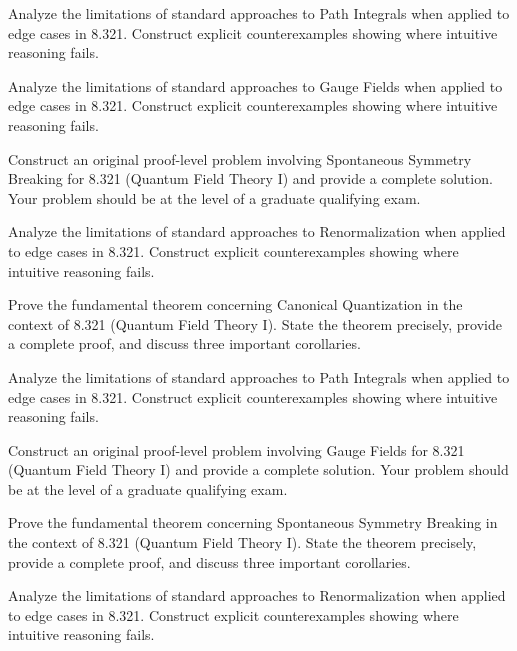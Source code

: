 \documentclass[12pt,a4paper]{exam}
\begin{document}
\begin{questions}
\vspace{0.3cm}

\question[4]
Analyze the limitations of standard approaches to Path Integrals when applied to edge cases in 8.321. Construct explicit counterexamples showing where intuitive reasoning fails.

\vspace{0.3cm}

\question[5]
Analyze the limitations of standard approaches to Gauge Fields when applied to edge cases in 8.321. Construct explicit counterexamples showing where intuitive reasoning fails.

\vspace{0.3cm}

\question[3]
Construct an original proof-level problem involving Spontaneous Symmetry Breaking for 8.321 (Quantum Field Theory I) and provide a complete solution. Your problem should be at the level of a graduate qualifying exam.

\vspace{0.3cm}

\question[6]
Analyze the limitations of standard approaches to Renormalization when applied to edge cases in 8.321. Construct explicit counterexamples showing where intuitive reasoning fails.

\vspace{0.3cm}

\question[4]
Prove the fundamental theorem concerning Canonical Quantization in the context of 8.321 (Quantum Field Theory I). State the theorem precisely, provide a complete proof, and discuss three important corollaries.

\vspace{0.3cm}

\question[3]
Analyze the limitations of standard approaches to Path Integrals when applied to edge cases in 8.321. Construct explicit counterexamples showing where intuitive reasoning fails.

\vspace{0.3cm}

\question[6]
Construct an original proof-level problem involving Gauge Fields for 8.321 (Quantum Field Theory I) and provide a complete solution. Your problem should be at the level of a graduate qualifying exam.

\vspace{0.3cm}

\question[3]
Prove the fundamental theorem concerning Spontaneous Symmetry Breaking in the context of 8.321 (Quantum Field Theory I). State the theorem precisely, provide a complete proof, and discuss three important corollaries.

\vspace{0.3cm}

\question[4]
Analyze the limitations of standard approaches to Renormalization when applied to edge cases in 8.321. Construct explicit counterexamples showing where intuitive reasoning fails.

\vspace{0.3cm}

\end{questions}
\end{document}
